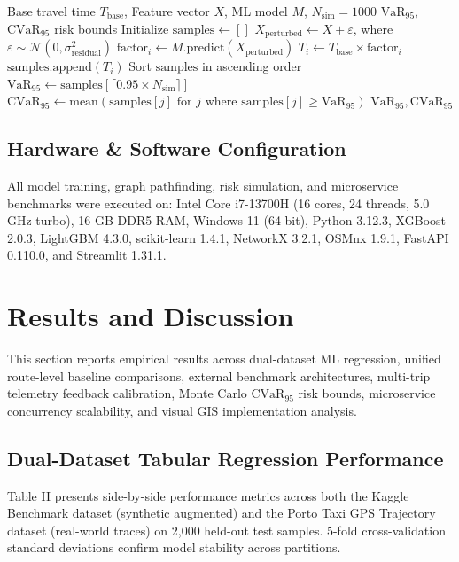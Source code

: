 \documentclass[journal]{IEEEtran}
\begin{document}
\begin{algorithm}[h]
\caption{Monte Carlo $\text{CVaR}_{95}$ Risk Estimation}
\begin{algorithmic}[1]
\REQUIRE Base travel time $T_{\text{base}}$, Feature vector $X$, ML model $M$, $N_{\text{sim}} = 1000$
\ENSURE $\text{VaR}_{95}$, $\text{CVaR}_{95}$ risk bounds
\STATE Initialize $\text{samples} \leftarrow []$
    \STATE $X_{\text{perturbed}} \leftarrow X + \varepsilon$, where $\varepsilon \sim \mathcal{N}(0, \sigma^2_{\text{residual}})$
    \STATE $\text{factor}_i \leftarrow M.\text{predict}(X_{\text{perturbed}})$
    \STATE $T_i \leftarrow T_{\text{base}} \times \text{factor}_i$
    \STATE $\text{samples.append}(T_i)$
\ENDFOR
\STATE Sort $\text{samples}$ in ascending order
\STATE $\text{VaR}_{95} \leftarrow \text{samples}[\lceil 0.95 \times N_{\text{sim}} \rceil]$
\STATE $\text{CVaR}_{95} \leftarrow \text{mean}(\text{samples}[j] \text{ for } j \text{ where } \text{samples}[j] \ge \text{VaR}_{95})$
\RETURN $\text{VaR}_{95}, \text{CVaR}_{95}$
\end{algorithmic}
\end{algorithm}

\subsection{Hardware \& Software Configuration}
All model training, graph pathfinding, risk simulation, and microservice benchmarks were executed on: Intel Core i7-13700H (16 cores, 24 threads, 5.0 GHz turbo), 16 GB DDR5 RAM, Windows 11 (64-bit), Python 3.12.3, XGBoost 2.0.3, LightGBM 4.3.0, scikit-learn 1.4.1, NetworkX 3.2.1, OSMnx 1.9.1, FastAPI 0.110.0, and Streamlit 1.31.1.

\section{Results and Discussion}
This section reports empirical results across dual-dataset ML regression, unified route-level baseline comparisons, external benchmark architectures, multi-trip telemetry feedback calibration, Monte Carlo $\text{CVaR}_{95}$ risk bounds, microservice concurrency scalability, and visual GIS implementation analysis.

\subsection{Dual-Dataset Tabular Regression Performance}
Table II presents side-by-side performance metrics across both the Kaggle Benchmark dataset (synthetic augmented) and the Porto Taxi GPS Trajectory dataset (real-world traces) on 2,000 held-out test samples. 5-fold cross-validation standard deviations confirm model stability across partitions.
\end{document}
